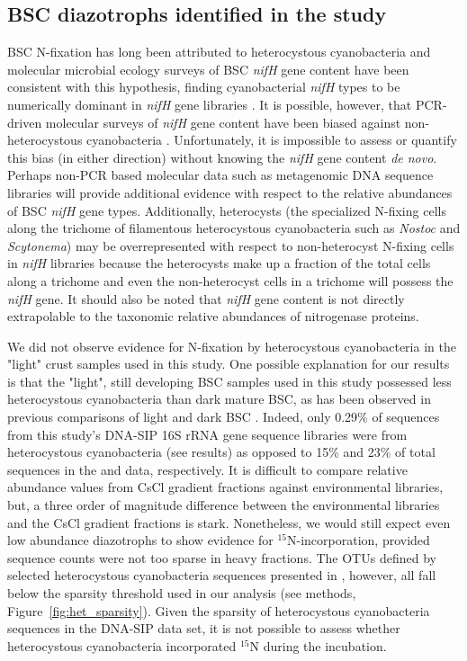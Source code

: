 \subsection{BSC diazotrophs identified in the study}
BSC N-fixation has long been attributed to heterocystous cyanobacteria and
molecular microbial ecology surveys of BSC \textit{nifH} gene content have been
consistent with this hypothesis, finding cyanobacterial \textit{nifH} types to
be numerically dominant in \textit{nifH} gene libraries
\citep{Yeager,14766579,Yeager_2012}. It is possible, however, that PCR-driven
molecular surveys of \textit{nifH} gene content have been biased against
non-heterocystous cyanobacteria \citep{Gaby_2012}. Unfortunately, it is impossible to
assess or quantify this bias (in either direction) without knowing the
\textit{nifH} gene content \textit{de novo}. Perhaps non-PCR based molecular
data such as metagenomic DNA sequence libraries will provide additional
evidence with respect to the relative abundances of BSC \textit{nifH} gene
types. Additionally, heterocysts (the specialized N-fixing cells along the
trichome of filamentous heterocystous cyanobacteria such as \textit{Nostoc} and
\textit{Scytonema}) may be overrepresented with respect to non-heterocyst
N-fixing cells in \textit{nifH} libraries because the heterocysts make up a
fraction of the total cells along a trichome and even the non-heterocyst cells
in a trichome will possess the \textit{nifH} gene. It should also be noted that
\textit{nifH} gene content is not directly extrapolable to the taxonomic
relative abundances of nitrogenase proteins.

We did not observe evidence for N-fixation by heterocystous cyanobacteria in
the "light" crust samples used in this study. One possible explanation for our
results is that the "light", still developing BSC samples used in this
study possessed less heterocystous cyanobacteria than dark mature BSC, as has
been observed in previous comparisons of light and dark BSC \citep{14766579}.
Indeed, only 0.29\% of sequences from this study's DNA-SIP 16S rRNA gene
sequence libraries were from heterocystous cyanobacteria (see results) as
opposed to 15\% and 23\% of total sequences in the \citet{Steven_2013} and
\citet{Garcia_Pichel_2013} data, respectively. It is difficult to compare
relative abundance values from CsCl gradient fractions against environmental
libraries, but, a three order of magnitude difference between the environmental
libraries and the CsCl gradient fractions is stark. Nonetheless, we would still
expect even low abundance diazotrophs to show evidence for $^{15}$N-incorporation,
provided sequence counts were not too sparse in heavy fractions. The OTUs
defined by selected heterocystous cyanobacteria sequences presented in
\citet{Yeager}, however, all fall below the sparsity threshold used in our
analysis (see methods, Figure~\ref{fig:het_sparsity}). Given the sparsity of
heterocystous cyanobacteria sequences in the DNA-SIP data set, it is not
possible to assess whether heterocystous cyanobacteria incorporated $^{15}$N during
the incubation.

